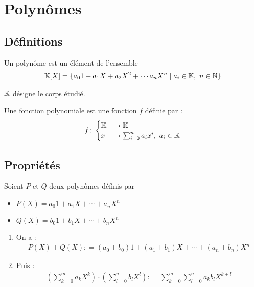 \chapter{Polynômes}

\section{Définitions}
\begin{graybox}
    \begin{definition}[Polynôme]
        Un polynôme est un élément de l'ensemble 
        \begin{align*}
            \mathbb{K}[X] = \{ a_0 1 + a_1 X + a_2 X^2 + \cdots a_n X^n \mid a_i \in \mathbb{K},\ n \in \mathbb{N} \}
        \end{align*}
    \end{definition}
\end{graybox}

\begin{remarque}
$\mathbb{K}$ désigne le corps étudié.
\end{remarque}
\begin{graybox}
    \begin{definition}
        Une fonction polynomiale est une fonction $f$ définie par :
        \begin{align*}
            f \colon 
            \begin{cases}
                \mathbb{K} &\to \mathbb{K} \\
                x &\mapsto \sum_{i = 0}^{n} a_i x^i,\ a_i \in \mathbb{K}
            \end{cases}
        \end{align*}
    \end{definition}
\end{graybox}

\section{Propriétés}
Soient $P$ et $Q$ deux polynômes définis par 
                \begin{itemize}
                    \item $P(X) = a_0 1 + a_1 X + \cdots + a_n X^n$
                    \item $Q(X) = b_0 1 + b_1 X+ \cdots + b_n X^n$
                \end{itemize}

        \begin{enumerate}
            \item On a :
            \begin{align*}
                P(X) + Q(X) \colon = (a_0 + b_0) 1 + (a_1 + b_1) X + \cdots + (a_n + b_n) X^n
            \end{align*}
        \item Puis :
            \begin{align*}
                (\sum_{k = 0}^m a_k X^k) \cdot (\sum_{l = 0}^{n} b_l X^l) \colon = \sum_{k = 0}^m \sum_{l = 0}^n a_k b_l X^{k + l}
            \end{align*}
\end{enumerate}

